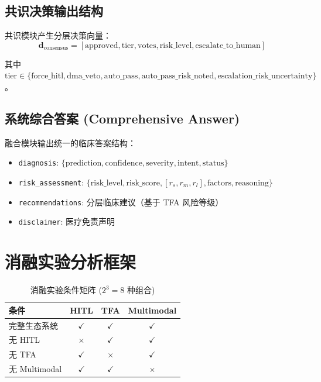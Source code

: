 \documentclass[11pt,a4paper]{ctexart}
\theoremstyle{remark}
\begin{document}
\subsection{共识决策输出结构}

共识模块产生分层决策向量：
\begin{equation}
\mathbf{d}_{\text{consensus}} = [\text{approved}, \text{tier}, \text{votes}, \text{risk\_level}, \text{escalate\_to\_human}]
\end{equation}

其中 $\text{tier} \in \{\text{force\_hitl}, \text{dma\_veto}, \text{auto\_pass}, \text{auto\_pass\_risk\_noted}, \text{escalation\_risk\_uncertainty}\}$。

\subsection{系统综合答案 (Comprehensive Answer)}

融合模块输出统一的临床答案结构：
\begin{itemize}[nosep]
\item \texttt{diagnosis}: $\{\text{prediction}, \text{confidence}, \text{severity}, \text{intent}, \text{status}\}$
\item \texttt{risk\_assessment}: $\{\text{risk\_level}, \text{risk\_score}, [r_s, r_m, r_l], \text{factors}, \text{reasoning}\}$
\item \texttt{recommendations}: 分层临床建议（基于 TFA 风险等级）
\item \texttt{disclaimer}: 医疗免责声明
\end{itemize}

\section{消融实验分析框架}

\begin{table}[H]
\centering
\small
\begin{tabular}{lccc}
\toprule
\textbf{条件} & \textbf{HITL} & \textbf{TFA} & \textbf{Multimodal} \\
\midrule
完整生态系统 & $\checkmark$ & $\checkmark$ & $\checkmark$ \\
无 HITL & $\times$ & $\checkmark$ & $\checkmark$ \\
无 TFA & $\checkmark$ & $\times$ & $\checkmark$ \\
无 Multimodal & $\checkmark$ & $\checkmark$ & $\times$ \\
\bottomrule
\end{tabular}
\caption{消融实验条件矩阵 ($2^3 = 8$ 种组合)}
\end{table}
\end{document}
